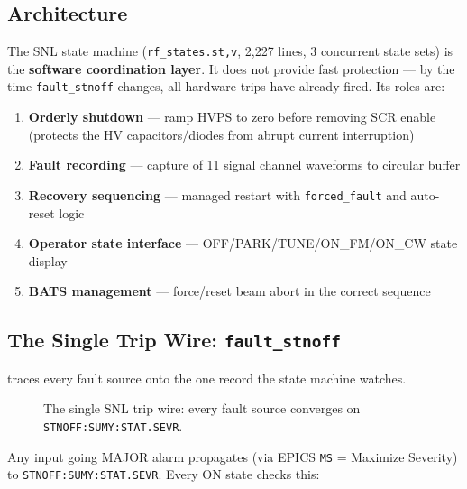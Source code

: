 \subsection{Architecture}\label{sec:snl-arch}


The SNL state machine (\texttt{rf\_\allowbreak{}states.\allowbreak{}st,v}, 2,227 lines, 3 concurrent state sets) is the \textbf{software coordination layer}. It does not provide fast protection --- by the time \texttt{fault\_stnoff} changes, all hardware trips have already fired. Its roles are:

\begin{enumerate}
\def\labelenumi{\arabic{enumi}.}
\tightlist
\item
  \textbf{Orderly shutdown} --- ramp HVPS to zero before removing SCR enable (protects the HV capacitors/diodes from abrupt current interruption)
\item
  \textbf{Fault recording} --- capture of 11 signal channel waveforms to circular buffer
\item
  \textbf{Recovery sequencing} --- managed restart with \texttt{forced\_fault} and auto-reset logic
\item
  \textbf{Operator state interface} --- OFF/PARK/TUNE/ON\_FM/ON\_CW state display
\item
  \textbf{BATS management} --- force/reset beam abort in the correct sequence
\end{enumerate}

\subsection{\texorpdfstring{The Single Trip Wire: \texttt{fault\_stnoff}}{The Single Trip Wire: fault\_stnoff}}\label{sec:snl-tripwire}


 traces every fault source onto the one record the state machine watches.


\begin{figure}[tbp]
\centering
\begin{fitpicture}\end{fitpicture}
\caption{The single SNL trip wire: every fault source converges on \texttt{STNOFF:\allowbreak{}SUMY:\allowbreak{}STAT.\allowbreak{}SEVR}.}\label{fig:snl-tripwire}
\end{figure}

Any input going MAJOR alarm propagates (via EPICS \texttt{MS} = Maximize Severity) to \texttt{STNOFF:\allowbreak{}SUMY:\allowbreak{}STAT.\allowbreak{}SEVR}. Every ON state checks this:

